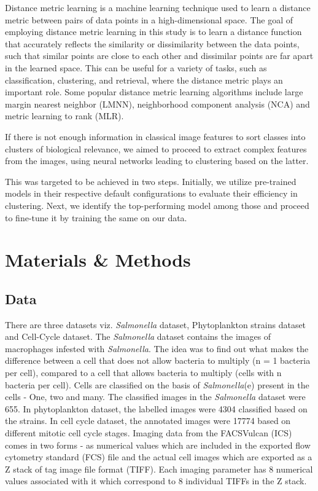 \documentclass[12pt,a4paper]{article}
\begin{document}
Distance metric learning is a machine learning technique used to learn a distance metric between pairs of data points in a high-dimensional space. The goal of employing distance metric learning in this study is to learn a distance function that accurately reflects the similarity or dissimilarity between the data points, such that similar points are close to each other and dissimilar points are far apart in the learned space. This can be useful for a variety of tasks, such as classification, clustering, and retrieval, where the distance metric plays an important role. Some popular distance metric learning algorithms include large margin nearest neighbor (LMNN), neighborhood component analysis (NCA) and metric learning to rank (MLR). 

If there is not enough information in classical image features to sort classes into clusters of biological relevance, we aimed to proceed to extract complex features from the images, using neural networks leading to clustering based on the latter.

This was targeted to be achieved in two steps. Initially, we utilize pre-trained models in their respective default configurations to evaluate their efficiency in clustering. Next, we identify the top-performing model among those and proceed to fine-tune it by training the same on our data.

\newpage
\section{Materials \& Methods}
\subsection{Data}
There are three datasets viz. \textit{Salmonella} dataset, Phytoplankton strains dataset and Cell-Cycle dataset. The \textit{Salmonella} dataset contains the images of macrophages infested with \textit{Salmonella}. The idea was to find out what makes the difference between a cell that does not allow bacteria to multiply (n = 1 bacteria per cell), compared to a cell that allows bacteria to multiply (cells with n  bacteria per cell). Cells are classified on the basis of \textit{Salmonella}(e) present in the cells - One, two and many. The classified images in the \textit{Salmonella} dataset were 655. In phytoplankton dataset, the labelled images were 4304 classified based on the strains. In cell cycle dataset, the annotated images were 17774 based on different mitotic cell cycle stages. Imaging data from the FACSVulcan (ICS) comes in two forms - as numerical values which are included in the exported flow cytometry standard (FCS) file and the actual cell images which are exported as a Z stack of tag image file format (TIFF). Each imaging parameter has 8 numerical values associated with it which correspond to 8 individual TIFFs in the Z stack.
\end{document}
